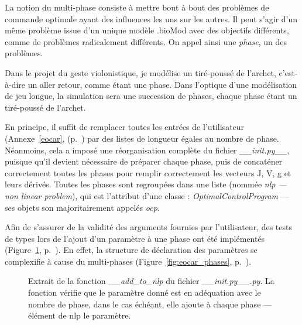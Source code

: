 La notion du multi-phase consiste à mettre bout à bout des problèmes de commande optimale ayant des influences les uns sur les autres. Il peut s'agir d'un même problème issue d'un unique modèle .bioMod avec des objectifs différents, comme de problèmes radicalement différents. On appel ainsi une \emph{phase}, un des problèmes.

Dans le projet du geste violonistique, je modélise un tiré-poussé de l'archet, c'est-à-dire un aller retour, comme étant une phase. Dans l'optique d'une modélisation de jeu longue, la simulation sera une succession de phases, chaque phase étant un tiré-poussé de l'archet.

En principe, il suffit de remplacer toutes les entrées de l'utilisateur (Annexe~\ref{eocar}, (p.~\pageref{eocar}) par des listes de longueur égales au nombre de phase. Néanmoins, cela a imposé une réorganisation complète du fichier \emph{\_\_init.py\_\_}, puisque qu'il devient nécessaire de préparer chaque phase, puis de concaténer correctement toutes les phases pour remplir correctement les vecteurs J, V, g et leurs dérivés. Toutes les phases sont regroupées dans une liste (nommée \emph{nlp --- non linear problem}), qui est l'attribut d'une classe : \emph{OptimalControlProgram} --- ses objets son majoritairement appelés \emph{ocp}.

Afin de s'assurer de la validité des arguments fournies par l'utilisateur, des tests de types lors de l'ajout d'un paramètre à une phase ont été implémentés (Figure~\ref{fig:test_type}, p.~\pageref{fig:test_type}). En effet, la structure de déclaration des paramètres se complexifie à cause du multi-phases (Figure~\ref{fig:eocar_phases}, p.~\pageref{fig:eocar_phases}).


\begin{center}
\setlength\itemsep{-0.5em}

\vspace{-0.6cm}
\begin{figure}[h]
\caption{Extrait de la fonction \emph{\_\_add\_to\_nlp} du fichier \emph{\_\_init.py\_\_.py}. La fonction vérifie que le paramètre donné est en adéquation avec le nombre de phase, dans le cas échéant, elle ajoute à chaque phase --- élément de nlp le paramètre.}
\label{fig:test_type}
\end{figure}
\end{center}

